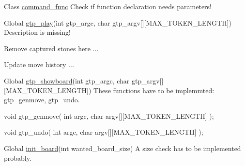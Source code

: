 \label{todo__todo000002}
\hypertarget{todo__todo000002}{}
 
\begin{DoxyDescription}
\item[Class \hyperlink{structcommand__func}{command\_\-func} ]Check if function declaration needs parameters! 
\end{DoxyDescription}

\label{todo__todo000004}
\hypertarget{todo__todo000004}{}
 
\begin{DoxyDescription}
\item[Global \hyperlink{group___g_t_p___core___play___commands_ga16a060c01868977200be0b381b03c6f9}{gtp\_\-play}(int gtp\_\-argc, char gtp\_\-argv\mbox{[}\mbox{]}\mbox{[}MAX\_\-TOKEN\_\-LENGTH\mbox{]}) ]Description is missing!

Remove captured stones here ... 

Update move history ... 
\end{DoxyDescription}

\label{todo__todo000003}
\hypertarget{todo__todo000003}{}
 
\begin{DoxyDescription}
\item[Global \hyperlink{group___g_t_p___debug___commands_ga7c297f28150386dc85b1de08e6f8d456}{gtp\_\-showboard}(int gtp\_\-argc, char gtp\_\-argv\mbox{[}\mbox{]}\mbox{[}MAX\_\-TOKEN\_\-LENGTH\mbox{]}) ]These functions have to be implemmted: gtp\_\-genmove, gtp\_\-undo.
\begin{DoxyItemize}
\item void gtp\_\-genmove( int argc, char argv\mbox{[}\mbox{]}\mbox{[}MAX\_\-TOKEN\_\-LENGTH\mbox{]} );
\item void gtp\_\-undo( int argc, char argv\mbox{[}\mbox{]}\mbox{[}MAX\_\-TOKEN\_\-LENGTH\mbox{]} ); 
\end{DoxyItemize}
\end{DoxyDescription}

\label{todo__todo000001}
\hypertarget{todo__todo000001}{}
 
\begin{DoxyDescription}
\item[Global \hyperlink{board_8h_ac70f31e9f413033ba999d4eccb459cb5}{init\_\-board}(int wanted\_\-board\_\-size) ]A size check has to be implemented probably. 
\end{DoxyDescription}